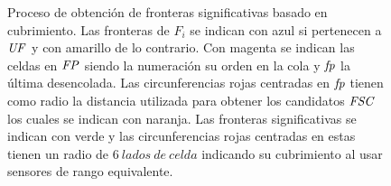 \begin{figure}[H]

  \caption[Proceso de obtención de fronteras significativas basado en cubrimiento.]{Proceso
    de obtención de fronteras significativas basado en cubrimiento. Las fronteras de $F_i$ se
    indican con azul si pertenecen a $\mathit{UF}$ y con amarillo de lo contrario.
    Con magenta se indican las celdas en $\mathit{FP}$ siendo la numeración su
    orden en la cola y $\mathit{fp}$ la última desencolada. Las
    circunferencias rojas centradas en $\mathit{fp}$ tienen como radio la distancia
    utilizada para obtener los candidatos $\mathit{FSC}$ los cuales se indican con
    naranja. Las fronteras significativas se indican con verde y las circunferencias rojas centradas en estas tienen un radio de $6\
  lados\ de\ celda$ indicando su cubrimiento
    al usar sensores de rango equivalente.}\label{fig:ejemploFSCubComp}

\end{figure}
